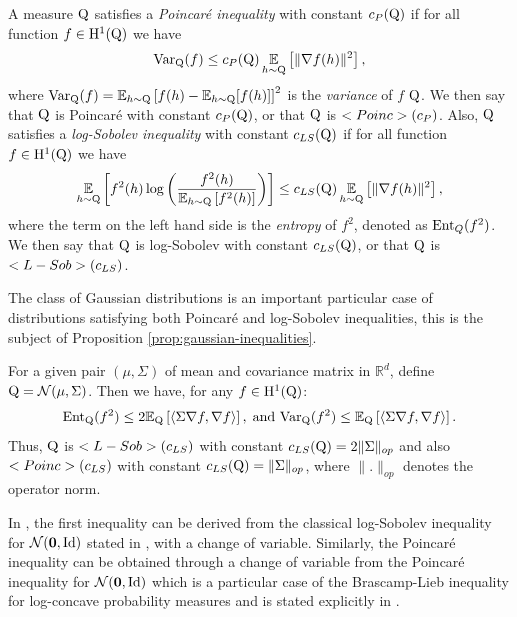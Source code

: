 \begin{definition}
A measure $\mathrm{Q}$ satisfies a \emph{Poincaré inequality} with constant $c_{P}(\mathrm{Q})$ if for all function $f\in \mathrm{H}^{1}(\mathrm{Q})$ we have 
\begin{align*}
 \mathrm{Var}_{\mathrm{Q}}(f) \leq c_{P}(\mathrm{Q}) \operatorname*{\mathbb{E}}_{h\sim \mathrm{Q}}\left[ \|\nabla f (h)\|^2 \right],
\end{align*}
where $\mathrm{Var}_{\mathrm{Q}}(f) = \operatorname*{\mathbb{E}}_{h\sim\mathrm{Q}} \left[f(h) - \operatorname*{\mathbb{E}}_{h\sim\mathrm{Q}}[f(h)]\right]^2$ is the \emph{variance} of $f$ \wrt $\mathrm{Q}$.
We then say that $\mathrm{Q}$ is Poincaré with constant $c_{P}(\mathrm{Q})$, or that $\mathrm{Q}$ is $<Poinc>(c_{P})$.
Also, $\mathrm{Q}$ satisfies a \emph{log-Sobolev inequality} with constant $c_{LS}(\mathrm{Q})$ if for all function $f\in \mathrm{H}^{1}(\mathrm{Q})$ we have 
\begin{align*}
\operatorname*{\mathbb{E}}_{h\sim\mathrm{Q}}\left[ f^2(h)\log\left( \frac{f^2(h)}{\mathbb{E}_{h\sim\mathrm{Q}}\left[ f^2(h)\right]}\right) \right] \leq c_{LS}(\mathrm{Q}) \operatorname*{\mathbb{E}}_{h\sim \mathrm{Q}}\left[ \|\nabla f (h)\|^2 \right],
\end{align*}
where the term on the left hand side is the \emph{entropy} of $f^2$, denoted as $\mathrm{Ent}_Q(f^2)$.
We then say that $\mathrm{Q}$ is log-Sobolev with constant $c_{LS}(\mathrm{Q})$, or that $\mathrm{Q}$ is $<L-Sob>(c_{LS})$.
\end{definition}
The class of Gaussian distributions is an important particular case of distributions satisfying both Poincaré and log-Sobolev inequalities, this is the subject of Proposition \ref{prop:gaussian-inequalities}.
\begin{proposition}\label{prop:gaussian-inequalities}
For a given pair $(\mu,\Sigma)$ of mean and covariance matrix in $\mathbb{R}^d$, define $\mathrm{Q}= \mathcal{N}(\mu, \Sigma)$.
Then we have, for any $f \in \mathrm{H}^{1}(\mathrm{Q})$:
\begin{align*}
\mathrm{Ent}_{\mathrm{Q}}(f^2) \leq 2\mathbb{E}_{\mathrm{Q}}\left[ \left\langle \Sigma \nabla f, \nabla f\right\rangle \right],\;\text{and }  \mathrm{Var}_{\mathrm{Q}}(f^2) \leq \mathbb{E}_{\mathrm{Q}}\left[ \left\langle \Sigma \nabla f, \nabla f\right\rangle \right].
\end{align*}
Thus, $\mathrm{Q}$ is $<L-Sob>(c_{LS})$ with constant $c_{LS}(\mathrm{Q})=2\|\Sigma\|_{op}$ and also  $<Poinc>(c_{LS})$ with constant $c_{LS}(\mathrm{Q})=\|\Sigma\|_{op}$, where $\|.\|_{op}$ denotes the operator norm. 
\end{proposition}
In , the first inequality can be derived from the classical log-Sobolev inequality for $\mathcal{N}(\mathbf{0},\textrm{Id})$ stated in \citet{gross1975lsi}, with a change of variable. Similarly, the Poincaré inequality can be obtained through a change of variable from the Poincaré inequality for $\mathcal{N}(\mathbf{0},\textrm{Id})$ which is a particular case of the Brascamp-Lieb inequality for log-concave probability measures \citep{brascamp1976extensions} and is stated explicitly in \citet[Theorem 1]{beckner1989new}. 


